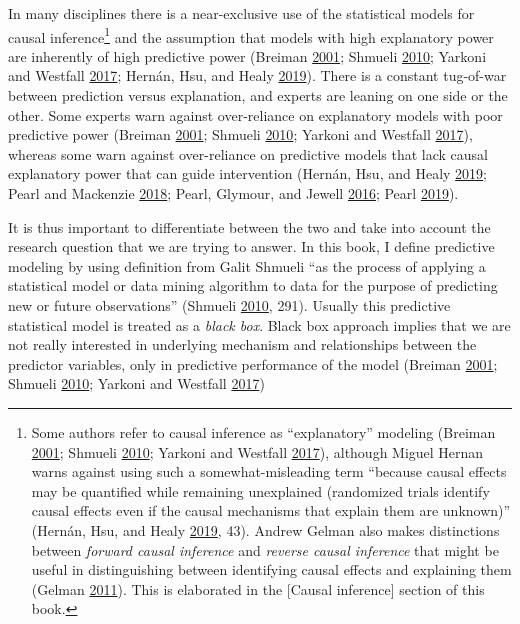 \documentclass[
]{book}
\begin{document}
In many disciplines there is a near-exclusive use of the statistical models for causal inference\footnote{Some authors refer to causal inference as ``explanatory'' modeling (Breiman \protect\hyperlink{ref-breimanStatisticalModelingTwo2001}{2001}; Shmueli \protect\hyperlink{ref-shmueliExplainPredict2010}{2010}; Yarkoni and Westfall \protect\hyperlink{ref-yarkoniChoosingPredictionExplanation2017}{2017}), although Miguel Hernan warns against using such a somewhat-misleading term ``because causal effects may be quantified while remaining unexplained (randomized trials identify causal effects even if the causal mechanisms that explain them are unknown)'' (Hernán, Hsu, and Healy \protect\hyperlink{ref-hernanSecondChanceGet2019}{2019}, 43). Andrew Gelman also makes distinctions between \emph{forward causal inference} and \emph{reverse causal inference} that might be useful in distinguishing between identifying causal effects and explaining them (Gelman \protect\hyperlink{ref-gelmanCausalityStatisticalLearning2011}{2011}). This is elaborated in the {[}Causal inference{]} section of this book.} and the assumption that models with high explanatory power are inherently of high predictive power (Breiman \protect\hyperlink{ref-breimanStatisticalModelingTwo2001}{2001}; Shmueli \protect\hyperlink{ref-shmueliExplainPredict2010}{2010}; Yarkoni and Westfall \protect\hyperlink{ref-yarkoniChoosingPredictionExplanation2017}{2017}; Hernán, Hsu, and Healy \protect\hyperlink{ref-hernanSecondChanceGet2019}{2019}). There is a constant tug-of-war between prediction versus explanation, and experts are leaning on one side or the other. Some experts warn against over-reliance on explanatory models with poor predictive power (Breiman \protect\hyperlink{ref-breimanStatisticalModelingTwo2001}{2001}; Shmueli \protect\hyperlink{ref-shmueliExplainPredict2010}{2010}; Yarkoni and Westfall \protect\hyperlink{ref-yarkoniChoosingPredictionExplanation2017}{2017}), whereas some warn against over-reliance on predictive models that lack causal explanatory power that can guide intervention (Hernán, Hsu, and Healy \protect\hyperlink{ref-hernanSecondChanceGet2019}{2019}; Pearl and Mackenzie \protect\hyperlink{ref-pearlBookWhyNew2018}{2018}; Pearl, Glymour, and Jewell \protect\hyperlink{ref-pearlCausalInferenceStatistics2016}{2016}; Pearl \protect\hyperlink{ref-pearlSevenToolsCausal2019}{2019}).

It is thus important to differentiate between the two and take into account the research question that we are trying to answer. In this book, I define predictive modeling by using definition from Galit Shmueli ``as the process of applying a statistical model or data mining algorithm to data for the purpose of predicting new or future observations'' (Shmueli \protect\hyperlink{ref-shmueliExplainPredict2010}{2010}, 291). Usually this predictive statistical model is treated as a \emph{black box}. Black box approach implies that we are not really interested in underlying mechanism and relationships between the predictor variables, only in predictive performance of the model (Breiman \protect\hyperlink{ref-breimanStatisticalModelingTwo2001}{2001}; Shmueli \protect\hyperlink{ref-shmueliExplainPredict2010}{2010}; Yarkoni and Westfall \protect\hyperlink{ref-yarkoniChoosingPredictionExplanation2017}{2017})
\end{document}
